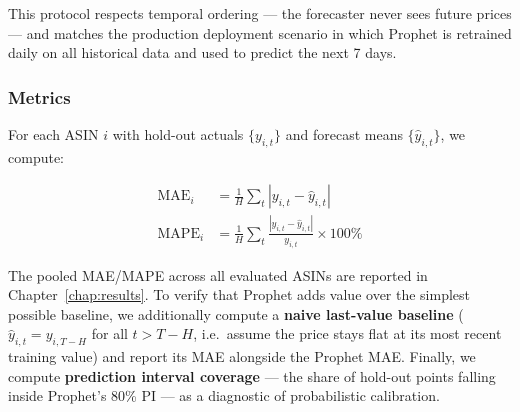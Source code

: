 This protocol respects temporal ordering --- the forecaster never sees
future prices --- and matches the production deployment scenario in which
Prophet is retrained daily on all historical data and used to predict the
next 7 days.

\subsubsection{Metrics}

For each ASIN $i$ with hold-out actuals $\{y_{i,t}\}$ and forecast means
$\{\hat{y}_{i,t}\}$, we compute:

\begin{align}
  \text{MAE}_i  &= \tfrac{1}{H}\sum_{t} |y_{i,t} - \hat{y}_{i,t}| \\
  \text{MAPE}_i &= \tfrac{1}{H}\sum_{t} \frac{|y_{i,t} - \hat{y}_{i,t}|}{y_{i,t}} \times 100\%
\end{align}

The pooled MAE/MAPE across all evaluated ASINs are reported in
Chapter~\ref{chap:results}. To verify that Prophet adds value over the
simplest possible baseline, we additionally compute a \textbf{naive last-value
baseline} ($\hat{y}_{i,t} = y_{i, T-H}$ for all $t > T-H$, i.e.\ assume the
price stays flat at its most recent training value) and report its MAE
alongside the Prophet MAE. Finally, we compute \textbf{prediction interval
coverage} --- the share of hold-out points falling inside Prophet's 80\% PI
--- as a diagnostic of probabilistic calibration.
